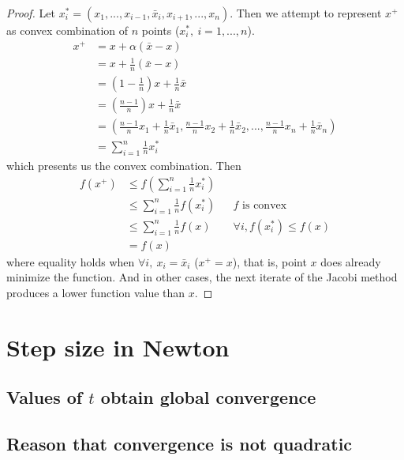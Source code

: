 \documentclass[11pt,a4paper]{article}
\begin{document}
\begin{proof}
    Let $x^*_i = (x_1, ..., x_{i-1}, \bar{x}_i, x_{i+1}, ..., x_n)$. Then we
    attempt to represent $x^{+}$ as convex combination of $n$ points
    ($x^*_i,\ i = 1,...,n$).
    \begin{align}
        x^{+} &= x + \alpha (\bar{x} - x) \\
        &= x + \frac{1}{n} (\bar{x} - x) \\
        &= (1 - \frac{1}{n})x +  \frac{1}{n}\bar{x} \\
        &= (\frac{n-1}{n})x +  \frac{1}{n}\bar{x} \\
        &= \left( \frac{n-1}{n}x_1 + \frac{1}{n} \bar{x}_1 ,
                \frac{n-1}{n}x_2 + \frac{1}{n} \bar{x}_2 ,
                    ... ,
                \frac{n-1}{n}x_n + \frac{1}{n} \bar{x}_n \right) \\
            &= \sum_{i=1}^{n} \frac{1}{n} x_i^* 
    \end{align}
    which presents us the convex combination. Then
    \begin{align}
        f(x^+) &\leq f(\sum_{i=1}^n \frac{1}{n} x_i^*)  \\
        &\leq \sum_{i=1}^n \frac{1}{n} f (x_i^*) && f \text{ is convex } \\
        &\leq \sum_{i=1}^n \frac{1}{n} f (x) && \forall i, f(x_i^*) \leq f(x) \\
        &= f(x)
    \end{align}
    where equality holds when $\forall i,\ x_i = \bar{x}_i$ ($x^+ = x$), that is, point
    $x$ does already minimize the function. And in other cases, the next
    iterate of the Jacobi method produces a lower function value than $x$.
\end{proof}

\newpage
\section{Step size in Newton}
\subsection{Values of $t$ obtain global convergence}

\subsection{Reason that convergence is not quadratic}
\end{document}
